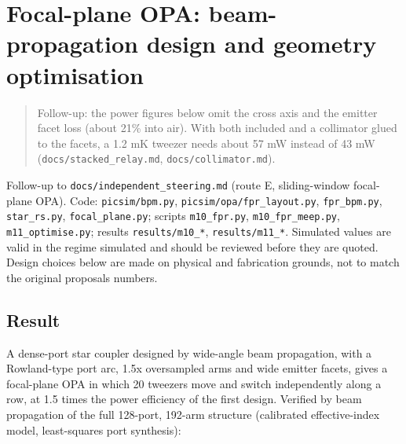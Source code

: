 \hypertarget{focal-plane-opa-beam-propagation-design-and-geometry-optimisation}{%
\chapter{Focal-plane OPA: beam-propagation design and geometry
optimisation}\label{fpr_design-focal-plane-opa-beam-propagation-design-and-geometry-optimisation}}

\begin{quote}
Follow-up: the power figures below omit the cross axis and the emitter
facet loss (about 21\% into air). With both included and a collimator
glued to the facets, a 1.2 mK tweezer needs about 57 mW instead of 43 mW
(\texttt{docs/stacked\_relay.md}, \texttt{docs/collimator.md}).
\end{quote}

Follow-up to \texttt{docs/independent\_steering.md} (route E,
sliding-window focal-plane OPA). Code: \texttt{picsim/bpm.py},
\texttt{picsim/opa/fpr\_layout.py}, \texttt{fpr\_bpm.py},
\texttt{star\_rs.py}, \texttt{focal\_plane.py}; scripts
\texttt{m10\_fpr.py}, \texttt{m10\_fpr\_meep.py},
\texttt{m11\_optimise.py}; results \texttt{results/m10\_*},
\texttt{results/m11\_*}. Simulated values are valid in the regime
simulated and should be reviewed before they are quoted. Design choices
below are made on physical and fabrication grounds, not to match the
original proposal\textquotesingle s numbers.

\hypertarget{1-result}{%
\section{Result}\label{fpr_design-1-result}}

A dense-port star coupler designed by wide-angle beam propagation, with
a Rowland-type port arc, 1.5x oversampled arms and wide emitter facets,
gives a focal-plane OPA in which 20 tweezers move and switch
independently along a row, at 1.5 times the power efficiency of the
first design. Verified by beam propagation of the full 128-port, 192-arm
structure (calibrated effective-index model, least-squares port
synthesis):

